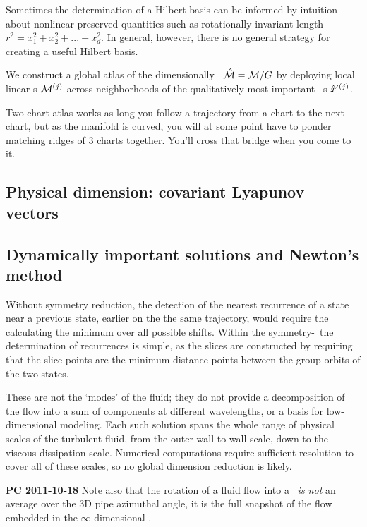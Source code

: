 Sometimes the determination of a Hilbert basis can be informed by
intuition about nonlinear preserved quantities such as rotationally
invariant length $r^2 = x_1^2 + x_2^2 + ... + x_d^2$. In general,
however, there is no general strategy for creating a useful Hilbert
basis.


We construct a
global atlas of the dimensionally \reducedsp\ $\hat{\cal M} = {\cal M}/G$ by
deploying local linear \slice s  ${\cal M}{}^{(j)}$ across neighborhoods of
the qualitatively most important \template\ {\cohStr s}
${\hat{x}'}{}^{(j)}$.

Two-chart atlas works as long you follow a trajectory from a chart to the
next chart, but as the manifold is curved, you will at some point have to
ponder matching ridges of 3 charts together. You'll cross that bridge
when you come to it.


\subsection{Physical dimension: covariant Lyapunov vectors}

\subsection{Dynamically important solutions and Newton's method}
\label{s:reqva}

Without symmetry reduction, the detection of the nearest recurrence of a
state near a previous state, earlier on the the same trajectory, would
require the calculating the minimum over all possible shifts. Within the
symmetry-\reducedsp\ the determination of recurrences is simple, as the
slices are constructed by requiring that the slice points are the minimum
distance points between the group orbits of the two states.

These are not the `modes' of the fluid; {they
do not provide a decomposition of the flow into a sum of components at
different wavelengths, or a basis for low-dimensional
modeling.} Each such solution spans the whole range of physical scales of
the turbulent fluid, from the outer wall-to-wall scale, down to the
viscous dissipation scale. Numerical computations require sufficient
resolution to cover all of these scales, so no {global} dimension
reduction is likely.

        {\bf PC 2011-10-18} Note also that the rotation of a fluid flow
        into a \slice\ {\em is not} an average over the 3D pipe azimuthal
        angle, it is the full snapshot of the flow embedded in the
        $\infty$-dimensional \statesp.

